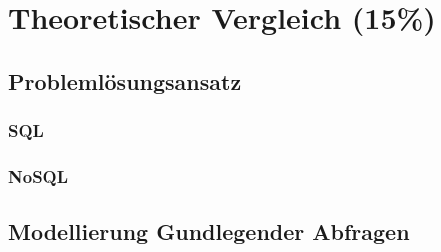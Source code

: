 \chapter{Theoretischer Vergleich (15\%)}
\section{Problemlösungsansatz}
\subsection{SQL}
\subsection{NoSQL}
\section{Modellierung Gundlegender Abfragen}
